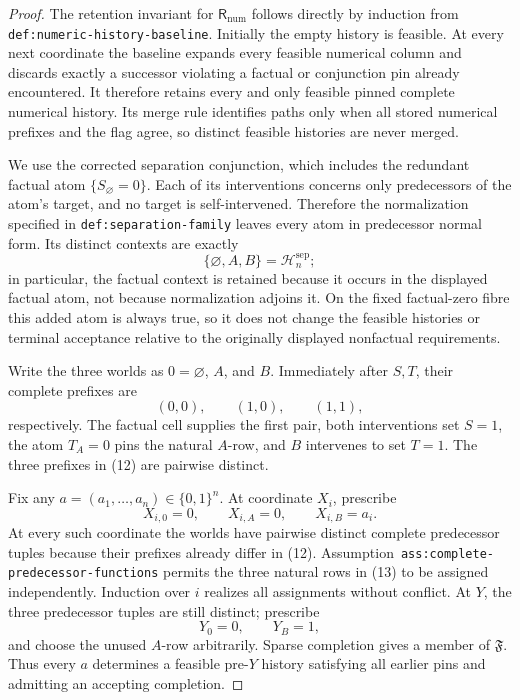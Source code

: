 \documentclass{article}
\begin{document}
\begin{proof}
The retention invariant for \(\mathsf R_{\mathrm{num}}\) follows directly by induction from \texttt{def:numeric-history-baseline}. Initially the empty history is feasible. At every next coordinate the baseline expands every feasible numerical column and discards exactly a successor violating a factual or conjunction pin already encountered. It therefore retains every and only feasible pinned complete numerical history. Its merge rule identifies paths only when all stored numerical prefixes and the flag agree, so distinct feasible histories are never merged.

We use the corrected separation conjunction, which includes the redundant factual atom \(\{S_{\varnothing}=0\}\). Each of its interventions concerns only predecessors of the atom's target, and no target is self-intervened. Therefore the normalization specified in \texttt{def:separation-family} leaves every atom in predecessor normal form. Its distinct contexts are exactly
\[
 \{\varnothing,A,B\}=\mathcal H_n^{\mathrm{sep}};
\]
in particular, the factual context is retained because it occurs in the displayed factual atom, not because normalization adjoins it. On the fixed factual-zero fibre this added atom is always true, so it does not change the feasible histories or terminal acceptance relative to the originally displayed nonfactual requirements.

Write the three worlds as \(0=\varnothing\), \(A\), and \(B\). Immediately after \(S,T\), their complete prefixes are
\[
 (0,0),
 \qquad
 (1,0),
 \qquad
 (1,1),
 \tag{12}
\]
respectively. The factual cell supplies the first pair, both interventions set \(S=1\), the atom \(T_A=0\) pins the natural \(A\)-row, and \(B\) intervenes to set \(T=1\). The three prefixes in (12) are pairwise distinct.

Fix any \(a=(a_1,\ldots,a_n)\in\{0,1\}^n\). At coordinate \(X_i\), prescribe
\[
 X_{i,0}=0,
 \qquad
 X_{i,A}=0,
 \qquad
 X_{i,B}=a_i.
 \tag{13}
\]
At every such coordinate the worlds have pairwise distinct complete predecessor tuples because their prefixes already differ in (12). Assumption~\texttt{ass:complete-predecessor-functions} permits the three natural rows in (13) to be assigned independently. Induction over \(i\) realizes all assignments without conflict. At \(Y\), the three predecessor tuples are still distinct; prescribe
\[
 Y_0=0,
 \qquad
 Y_B=1,
\]
and choose the unused \(A\)-row arbitrarily. Sparse completion gives a member of \(\mathfrak F\). Thus every \(a\) determines a feasible pre-\(Y\) history satisfying all earlier pins and admitting an accepting completion.


\end{proof}
\end{document}
